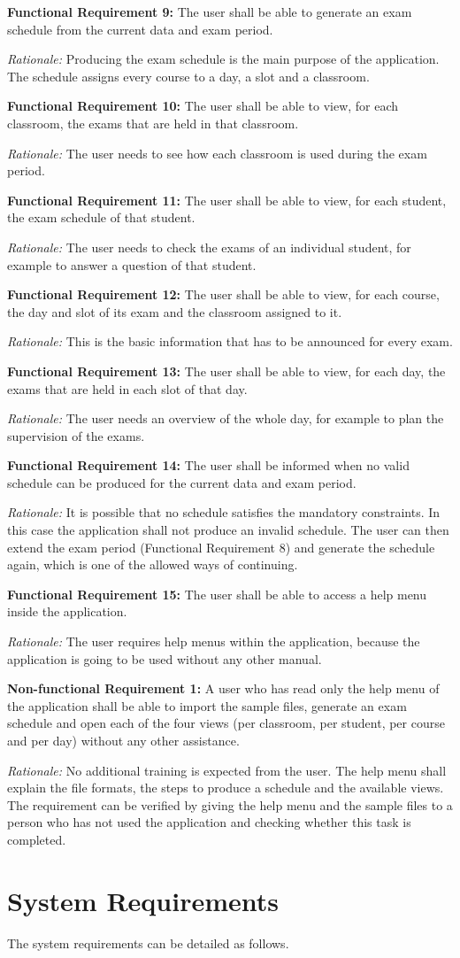 \documentclass[11pt,a4paper]{article}
\newcommand{\reqitem}[3]{\par\vspace{2pt}\noindent\textbf{#1:} #2\par\nopagebreak
  \begin{list}{}{\setlength{\leftmargin}{1.2em}\setlength{\topsep}{0pt}\setlength{\itemsep}{0pt}\setlength{\parsep}{0pt}}\item\emph{Rationale:} #3\end{list}}
\begin{document}
\reqitem{Functional Requirement 9}{The user shall be able to generate an exam schedule from the current data and exam period.}{Producing the exam schedule is the main purpose of the application. The schedule assigns every course to a day, a slot and a classroom.}
\reqitem{Functional Requirement 10}{The user shall be able to view, for each classroom, the exams that are held in that classroom.}{The user needs to see how each classroom is used during the exam period.}
\reqitem{Functional Requirement 11}{The user shall be able to view, for each student, the exam schedule of that student.}{The user needs to check the exams of an individual student, for example to answer a question of that student.}
\reqitem{Functional Requirement 12}{The user shall be able to view, for each course, the day and slot of its exam and the classroom assigned to it.}{This is the basic information that has to be announced for every exam.}
\reqitem{Functional Requirement 13}{The user shall be able to view, for each day, the exams that are held in each slot of that day.}{The user needs an overview of the whole day, for example to plan the supervision of the exams.}
\reqitem{Functional Requirement 14}{The user shall be informed when no valid schedule can be produced for the current data and exam period.}{It is possible that no schedule satisfies the mandatory constraints. In this case the application shall not produce an invalid schedule. The user can then extend the exam period (Functional Requirement 8) and generate the schedule again, which is one of the allowed ways of continuing.}
\reqitem{Functional Requirement 15}{The user shall be able to access a help menu inside the application.}{The user requires help menus within the application, because the application is going to be used without any other manual.}
\reqitem{Non-functional Requirement 1}{A user who has read only the help menu of the application shall be able to import the sample files, generate an exam schedule and open each of the four views (per classroom, per student, per course and per day) without any other assistance.}{No additional training is expected from the user. The help menu shall explain the file formats, the steps to produce a schedule and the available views. The requirement can be verified by giving the help menu and the sample files to a person who has not used the application and checking whether this task is completed.}
\section{System Requirements}
The system requirements can be detailed as follows.
\end{document}
